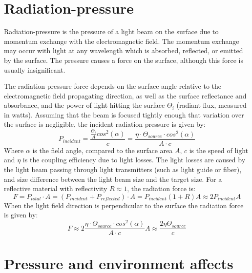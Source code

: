 \documentclass[\main/master.tex]{subfiles}
\begin{document}
\section{Radiation-pressure}
Radiation-pressure is the pressure of a light beam on the surface due to momentum exchange with the electromagnetic field. The momentum exchange may occur with light at any wavelength which is absorbed, reflected, or emitted by the surface. The pressure causes a force on the surface, although this force is usually insignificant.  
\par\noindent
The radiation-pressure force depends on the surface angle relative to the electromagnetic field propagating direction, as well as the surface reflectance and absorbance, and the power of light hitting the surface $\Theta_i$ (radiant flux, measured in watts). Assuming that the beam is focused tightly enough that variation over the surface is negligible, the incident radiation pressure is given by:
\begin{equation}
P_{incident} = \frac{\frac{\Theta_i}{A}cos^2(\alpha)}{c} = \frac{\eta\cdot \Theta_{source}\cdot cos^2(\alpha)}{{A\cdot c}} \label{eqn:radiation_pressure}
\end{equation}
Where $\alpha$ is the field angle, compared to the surface area $A$, $c$ is the speed of light and $\eta$ is the coupling efficiency due to light losses. The light losses are caused by the light beam passing through light transmitters (such as light guide or fiber), and size difference between the light beam size and the target size. For a reflective material with reflectivity $R\approx 1$, the radiation force is:
\begin{equation}
F = P_{total}\cdot A = (P_{incident}+P_{reflected})\cdot A = P_{incident}(1+R)A\approx 2P_{incident}A \label{eqn:radiation_force}
\end{equation}
When the light field direction is perpendicular to the surface the radiation force is given by:
\begin{equation}
F \approx   2\frac{\eta\cdot \Theta_{source}\cdot cos^2(\alpha)}{{A\cdot c}}A  \approx\frac{2\eta\Theta_{source}}{{c}} \label{eqn:radiation_force_power}
\end{equation}


\section{Pressure and environment affects}
\end{document}

